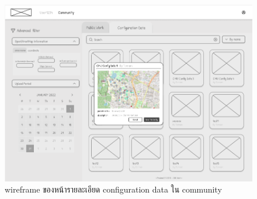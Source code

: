 \begin{mypara}
\begin{itemize}
\begin{itemize}
        \begin{figure}[H]
        \centering
        \includegraphics[scale=0.4]{conf_commu_detail_reg.png}
        \caption{wireframe ของหน้ารายละเอียด configuration data ใน community}
        \label{fig:WireframeCommunityConfigDetailLogin}
        \end{figure}


\end{itemize}
\end{itemize}
\end{mypara}
